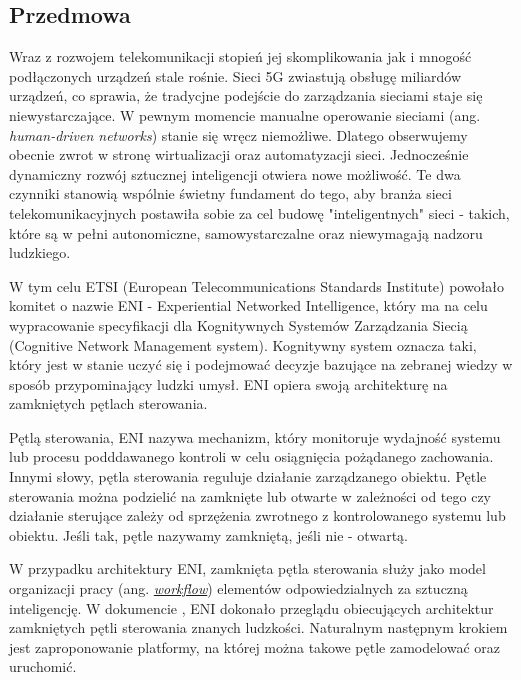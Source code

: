 \subsection{Przedmowa}

Wraz z rozwojem telekomunikacji stopień jej skomplikowania jak i mnogość podłączonych urządzeń stale rośnie. Sieci 5G zwiastują obsługę miliardów urządzeń, co sprawia, że tradycjne podejście do zarządzania sieciami staje się niewystarczające. W pewnym momencie manualne operowanie sieciami (ang. \textit{human-driven networks}) stanie się wręcz niemożliwe. Dlatego obserwujemy obecnie zwrot w stronę wirtualizacji oraz automatyzacji sieci. Jednocześnie dynamiczny rozwój sztucznej inteligencji otwiera nowe możliwość. Te dwa czynniki stanowią wspólnie świetny fundament do tego, aby branża sieci telekomunikacyjnych postawiła sobie za cel budowę "inteligentnych" sieci - takich, które są w pełni autonomiczne, samowystarczalne oraz niewymagają nadzoru ludzkiego.

W tym celu ETSI (European Telecommunications Standards Institute) powołało komitet o nazwie ENI - Experiential Networked Intelligence, który ma na celu wypracowanie specyfikacji dla Kognitywnych Systemów Zarządzania Siecią (Cognitive Network Management system). Kognitywny system oznacza taki, który jest w stanie uczyć się i podejmować decyzje bazujące na zebranej wiedzy w sposób przypominający ludzki umysł. ENI opiera swoją architekturę na zamkniętych pętlach sterowania.

Pętlą sterowania, ENI nazywa mechanizm, który monitoruje wydajność systemu lub procesu podddawanego kontroli w celu osiągnięcia pożądanego zachowania. Innymi słowy, pętla sterowania reguluje działanie zarządzanego obiektu. Pętle sterowania można podzielić na zamknięte lub otwarte w zależności od tego czy działanie sterujące zależy od sprzężenia zwrotnego z kontrolowanego systemu lub obiektu. Jeśli tak, pętle nazywamy zamkniętą, jeśli nie - otwartą. 

W przypadku architektury ENI, zamknięta pętla sterowania służy jako model organizacji pracy (ang. \hyperref[def:workflow]{\textit{workflow}}) elementów odpowiedzialnych za sztuczną inteligencję. W dokumencie \cite*{enioverview}, ENI dokonało przeglądu obiecujących architektur zamkniętych pętli sterowania znanych ludzkości. Naturalnym następnym krokiem jest zaproponowanie platformy, na której można takowe pętle zamodelować oraz uruchomić. 


